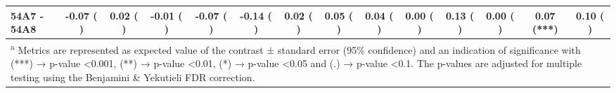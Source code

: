 \documentclass{article}\usepackage[table]{xcolor}
\renewcommand{\$}{$} %
\begin{document}
\begin{center}
\begin{table}[!h]
{\begin{tabular}[t]{lccccccccccccc}
\addlinespace
54A7 - 54A8 & -0.07   ( ) & 0.02   ( ) & -0.01   ( ) & -0.07   ( ) & -0.14   ( ) & 0.02   ( ) & 0.05   ( ) & 0.04   ( ) & 0.00   ( ) & 0.13   ( ) & 0.00   ( ) & 0.07 (***) & 0.10   ( )\\
\bottomrule
\multicolumn{14}{l}{\textsuperscript{a} Metrics are represented as expected value of the contrast ± standard error (95\% confidence) and an indication of significance with (***) → p-value <0.001, (**) → p-value <0.01, (*) → p-value <0.05 and (.) → p-value <0.1. The p-values are adjusted for multiple testing using the Benjamini \& Yekutieli FDR correction.}\\
\end{tabular}}
\end{table}


\end{center}
\clearpage %
\end{document}

